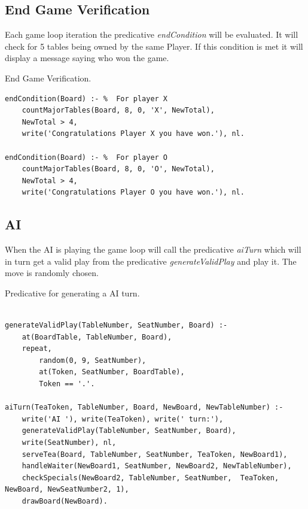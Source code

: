 \documentclass[a4paper]{article}
\begin{document}
\subsection{End Game Verification}
 Each game loop iteration the predicative \textit{endCondition} will be evaluated. It will check for 5 tables being owned by the same Player. If this condition is met it will
  display a message saying who won the game.

\renewcommand\listingscaption{Code}

\begin{listing}[H]
    \caption{End Game Verification.}
    \label{Codigo:cod_end}
    \begin{verbatim}
endCondition(Board) :- %  For player X
    countMajorTables(Board, 8, 0, 'X', NewTotal),
    NewTotal > 4,
    write('Congratulations Player X you have won.'), nl.

endCondition(Board) :- %  For player O
    countMajorTables(Board, 8, 0, 'O', NewTotal),
    NewTotal > 4,
    write('Congratulations Player O you have won.'), nl.

\end{verbatim}

\end{listing}

\subsection{AI}
    When the AI is playing the game loop will call the predicative \textit{aiTurn} which will in turn get a valid play
    from the predicative \textit{generateValidPlay} and play it. The move is randomly chosen.

\begin{listing}[H]
    \caption{Predicative for generating a AI turn.}
    \label{Codigo:cod_ai}
    \begin{verbatim}

generateValidPlay(TableNumber, SeatNumber, Board) :-
    at(BoardTable, TableNumber, Board),
    repeat,
        random(0, 9, SeatNumber),
        at(Token, SeatNumber, BoardTable),
        Token == '.'.

aiTurn(TeaToken, TableNumber, Board, NewBoard, NewTableNumber) :-
    write('AI '), write(TeaToken), write(' turn:'),
    generateValidPlay(TableNumber, SeatNumber, Board),
    write(SeatNumber), nl,
    serveTea(Board, TableNumber, SeatNumber, TeaToken, NewBoard1),
    handleWaiter(NewBoard1, SeatNumber, NewBoard2, NewTableNumber),
    checkSpecials(NewBoard2, TableNumber, SeatNumber,  TeaToken, NewBoard, NewSeatNumber2, 1),
    drawBoard(NewBoard).

\end{verbatim}

\end{listing}
\end{document}
